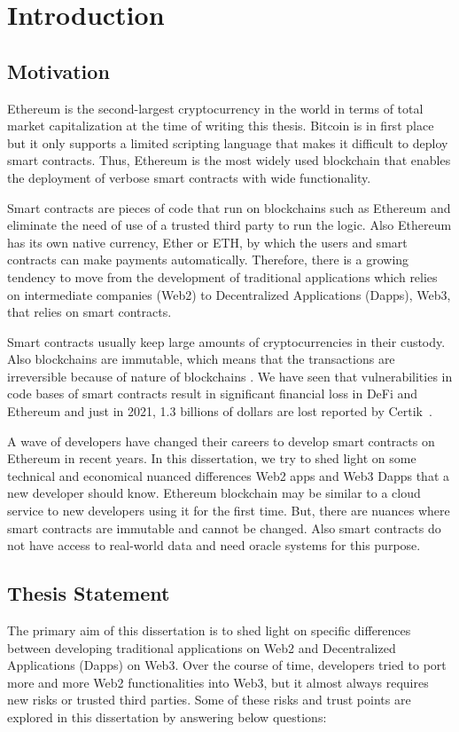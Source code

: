 \chapter{Introduction}


\section{Motivation}
Ethereum is the second-largest cryptocurrency in the world in terms of total market capitalization at the time of writing this thesis. Bitcoin is in first place but it only supports a limited scripting language that makes it difficult to deploy smart contracts. Thus, Ethereum is the most widely used blockchain that enables the deployment of verbose smart contracts with wide functionality.

Smart contracts are pieces of code that run on blockchains such as Ethereum and eliminate the need of use of a trusted third party to run the logic. Also Ethereum has its own native currency, Ether or ETH, by which the users and smart contracts can make payments automatically.
Therefore, there is a growing tendency to move from the development of traditional applications which relies on intermediate companies (Web2) to Decentralized Applications (Dapps), Web3, that relies on smart contracts. 

Smart contracts usually keep large amounts of cryptocurrencies in their custody. Also blockchains are immutable, which means that the transactions are irreversible because of nature of blockchains . 
We have seen that vulnerabilities in code bases of smart contracts result in significant financial loss in DeFi and Ethereum and just in 2021, 1.3 billions of dollars are lost reported by Certik~\cite{certikReport}.


A wave of developers have changed their careers to develop smart contracts on Ethereum in recent years. In this dissertation, we try to shed light on some technical and economical nuanced differences Web2 apps and Web3 Dapps that a new developer should know. Ethereum blockchain may be similar to a cloud service to new developers using it for the first time. But, there are nuances where smart contracts are immutable and cannot be changed. Also smart contracts do not have access to real-world data and need oracle systems for this purpose.


\section{Thesis Statement}
The primary aim of this dissertation is to shed light on specific differences between developing traditional applications on Web2 and Decentralized Applications (Dapps) on Web3. Over the course of time, developers tried to port more and more Web2 functionalities into Web3, but it almost always requires new risks or trusted third parties. Some of these risks and trust points are explored in this dissertation by answering below questions:

